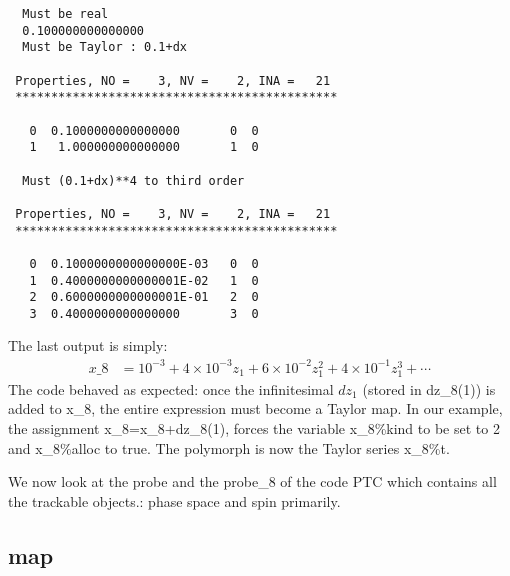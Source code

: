 \documentclass[english,12pt,article]{article} %
\begin{document}
{\scriptsize
\begin{verbatim}
  Must be real
  0.100000000000000
  Must be Taylor : 0.1+dx

 Properties, NO =    3, NV =    2, INA =   21
 *********************************************

   0  0.1000000000000000       0  0
   1   1.000000000000000       1  0

  Must (0.1+dx)**4 to third order

 Properties, NO =    3, NV =    2, INA =   21
 *********************************************

   0  0.1000000000000000E-03   0  0
   1  0.4000000000000001E-02   1  0
   2  0.6000000000000001E-01   2  0
   3  0.4000000000000000       3  0
\end{verbatim}
}
The last output is simply:
%
\begin{align} x\_8&={10}^{-3}+4\times {10}^{-3}{z}_{1}+6\times {10}^{-2}{z}_{1}^{2}+4\times {10}^{-1}{z}_{1}^{3}+\cdots \end{align}
%
The code behaved as expected: once the infinitesimal  $dz_1$ (stored in dz\_8(1)) is added to x\_8, the entire expression must become a Taylor map.
In our example, the assignment x\_8=x\_8+dz\_8(1), forces the variable x\_8\%kind to be  set to 2 and  x\_8\%alloc  to true. The polymorph is now the Taylor series  x\_8\%t.


We now look at the probe  and the probe\_8 of the code PTC which contains all the trackable objects.: phase space and  spin primarily.

\subsection{ map}\label{sub:map}

\end{document}

